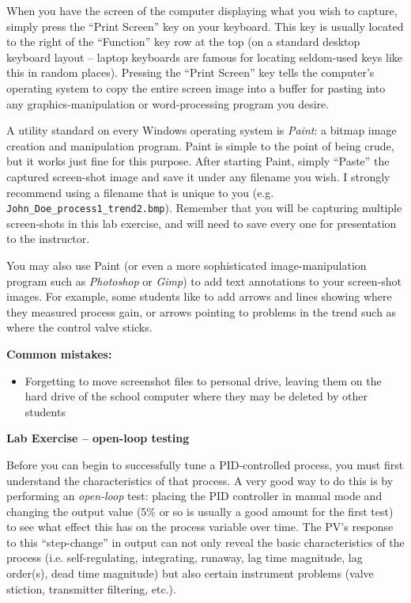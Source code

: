 \documentclass[12pt,a4paper]{article}
\begin{document}
When you have the screen of the computer displaying what you wish to capture, simply press the ``Print Screen'' key on your keyboard.  This key is usually located to the right of the ``Function'' key row at the top (on a standard desktop keyboard layout -- laptop keyboards are famous for locating seldom-used keys like this in random places).  Pressing the ``Print Screen'' key tells the computer's operating system to copy the entire screen image into a buffer for pasting into any graphics-manipulation or word-processing program you desire.

A utility standard on every Windows operating system is {\it Paint}: a bitmap image creation and manipulation program.  Paint is simple to the point of being crude, but it works just fine for this purpose.  After starting Paint, simply ``Paste'' the captured screen-shot image and save it under any filename you wish.  I strongly recommend using a filename that is unique to you (e.g. {\tt John\_Doe\_process1\_trend2.bmp}).  Remember that you will be capturing multiple screen-shots in this lab exercise, and will need to save every one for presentation to the instructor.  

You may also use Paint (or even a more sophisticated image-manipulation program such as {\it Photoshop} or {\it Gimp}) to add text annotations to your screen-shot images.  For example, some students like to add arrows and lines showing where they measured process gain, or arrows pointing to problems in the trend such as where the control valve sticks.

\vskip 10pt

{\bf Common mistakes:}

\begin{itemize}
\item{} Forgetting to move screenshot files to personal drive, leaving them on the hard drive of the school computer where they may be deleted by other students
\end{itemize}






\vfil \eject

\noindent
{\bf Lab Exercise -- open-loop testing}

\vskip 5pt

Before you can begin to successfully tune a PID-controlled process, you must first understand the characteristics of that process.  A very good way to do this is by performing an {\it open-loop} test: placing the PID controller in manual mode and changing the output value (5\% or so is usually a good amount for the first test) to see what effect this has on the process variable over time.  The PV's response to this ``step-change'' in output can not only reveal the basic characteristics of the process (i.e. self-regulating, integrating, runaway, lag time magnitude, lag order(s), dead time magnitude) but also certain instrument problems (valve stiction, transmitter filtering, etc.).
\end{document}
